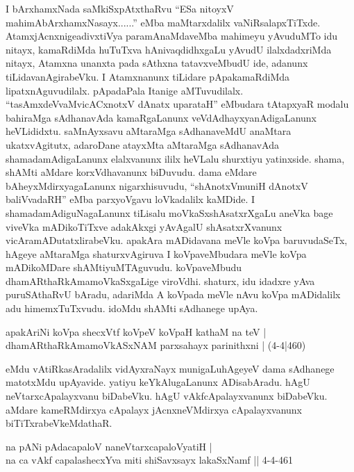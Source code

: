 \begin{artha}
I bArxhamxNada saMkiSxpAtxthaRvu ``ESa nitoyxV mahimA\break bArxhamxNasayx......'' eMba maMtarxdalilx vaNiRsalapxTiTxde. AtamxjAcnxnige\break adivxtiVya paramAnaMdaveMba mahimeyu yAvuduMTo idu nitayx, kamaRdiMda huTuTxva hAnivaqdidhxgaLu yAvudU ilalxdadxriMda nitayx, Atamxna unanxta pada sAthxna tatavxveMbudU ide, adanunx tiLidavanAgirabeVku. I Atamxnanunx tiLidare pApakamaRdiMda lipatxnAguvudilalx. pApadaPala Itanige aMTuvudilalx. ``tasAmxdeVvaMvicACxnotxV dAnatx uparataH'' eMbudara tAtapxyaR modalu bahiraMga sAdhanavAda kamaRgaLanunx veVdAdhayxyanAdigaLanunx heVLididxtu. saMnAyxsavu aMtaraMga sAdhanaveMdU anaMtara ukatxvAgitutx, adaroDane atayxMta aMtaraMga sAdhanavAda shamadamAdigaLanunx elalxvanunx ililx heVLalu shurxtiyu yatinxside. shama, shAMti aMdare korxVdhavanunx biDuvudu. dama eMdare bAheyxMdirxyagaLanunx nigarxhisuvudu, ``shAnotxVmuniH dAnotxV baliVvadaRH'' eMba parxyoVgavu loVkadalilx kaMDide. I shamadamAdiguNagaLanunx tiLisalu moVkaSxshAsatxrXgaLu aneVka bage viveVka mADikoTiTxve adakAkxgi yAvAgalU shAsatxrXvanunx vicAramADutatxlirabeVku. apakAra mADidavana meVle koVpa baruvudaSeTx, hAgeye aMtaraMga shaturxvAgiruva I koVpaveMbudara meVle koVpa mADikoMDare shAMtiyuMTAguvudu. koVpaveMbudu dhamARthaRkAmamoVkaSxgaLige viroVdhi. shaturx, idu idadxre yAva puruSAthaRvU bAradu, adariMda A koVpada meVle nAvu koVpa mADidalilx adu himemxTuTxvudu. idoMdu shAMti sAdhanege upAya. 
\end{artha}

\begin{shl}
apakAriNi koVpa shecxVtf koVpeV koVpaH kathaM na teV |\\
dhamARthaRkAmamoVkASxNAM parxsahayx parinithxni | (4-4|460)
\end{shl}

\begin{artha}
eMdu vAtiRkasAradalilx vidAyxraNayx munigaLu\ndash  hAgeyeV dama sAdhanege matotxMdu upAyavide. yatiyu keYkAlugaLanunx ADisabAradu. hAgU neVtarxcApalayxvanu biDabeVku. hAgU vAkfcApalayxvanunx biDabeVku. aMdare kameRMdirxya cApalayx jAcnxneVMdirxya cApalayxvanunx biTiTxrabeVkeMdathaR. 
\end{artha}

\begin{shl}
na pANi pAdacapaloV naneVtarxcapaloVyatiH |\\
na ca vAkf capalashecxYva miti shiSavxsayx lakaSxNamf || 4-4-461
\end{shl}


